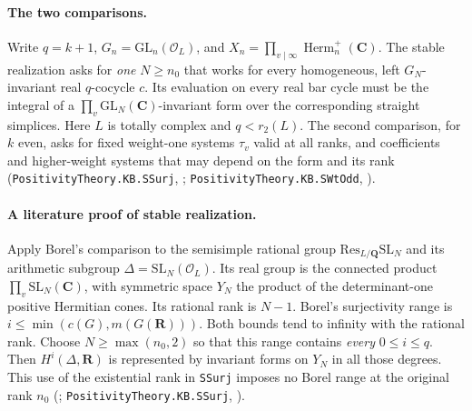 \paragraph{The two comparisons.}
Write $q=k+1$, $G_n=\mathrm{GL}_n(\mathcal O_L)$, and
$X_n=\prod_{v\mid\infty}\operatorname{Herm}_n^+(\mathbf C)$. The stable
realization asks for \emph{one} $N\ge n_0$ that works for every homogeneous,
left $G_N$-invariant real $q$-cocycle $c$. Its evaluation on every real
bar cycle must be the integral of a $\prod_v\mathrm{GL}_N(\mathbf C)$-invariant
form over the corresponding straight simplices. Here $L$ is totally complex
and $q<r_2(L)$. The second comparison, for $k$ even, asks for fixed
weight-one systems $\tau_v$ valid at all ranks, and coefficients and
higher-weight systems that may depend on the form and its rank
(\nolinkurl{PositivityTheory.KB.SSurj}, ;
\nolinkurl{PositivityTheory.KB.SWtOdd}, ).

\paragraph{A literature proof of stable realization.}
Apply Borel's comparison to the semisimple rational group
$\mathrm{Res}_{L/\mathbf Q}\mathrm{SL}_N$ and its arithmetic subgroup
$\Delta=\mathrm{SL}_N(\mathcal O_L)$. Its real group is the connected
product $\prod_v\mathrm{SL}_N(\mathbf C)$, with symmetric space $Y_N$
the product of the determinant-one positive Hermitian cones. Its rational
rank is $N-1$. Borel's surjectivity range is
$i\le\min(c(G),m(G(\mathbf R)))$. Both bounds tend to infinity with the
rational rank. Choose $N\ge\max(n_0,2)$ so that this range contains
\emph{every} $0\le i\le q$. Then $H^i(\Delta,\mathbf R)$ is represented
by invariant forms on $Y_N$ in all those degrees. This use of the
existential rank in \nolinkurl{SSurj} imposes no Borel range at the
original rank $n_0$
(\cite[Theorem 7.5, \S9.5 and \S\S11.2--11.4]{P-R5-Borel-stable};
\nolinkurl{PositivityTheory.KB.SSurj}, ).

